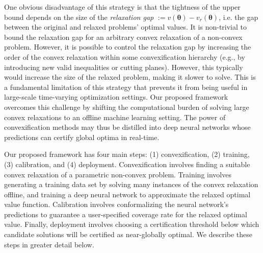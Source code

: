 \documentclass[10pt]{article} %
\theoremstyle{plain}
\theoremstyle{definition}
\theoremstyle{remark}
\begin{document}
One obvious disadvantage of this strategy is that the tightness of the upper bound depends on the size of the \textit{relaxation gap} $:= v(\bm{\theta}) - v_r(\bm{\theta})$, i.e. the gap between the original and relaxed problems' optimal values. It is non-trivial to bound the relaxation gap for an arbitrary convex relaxation of a non-convex problem. However, it is possible to control the relaxation gap by increasing the order of the convex relaxation within some convexification hierarchy (e.g., by introducing new valid inequalities or cutting planes). However, this typically would increase the size of the relaxed problem, making it slower to solve. 
This is a fundamental limitation of this strategy that prevents it from being useful in large-scale time-varying optimization settings.
Our proposed framework overcomes this challenge by shifting the computational burden of solving large convex relaxations to an offline machine learning setting.
The power of convexification methods may thus be distilled into deep neural networks whose predictions can certify global optima in real-time.

Our proposed framework has four main steps: (1) convexification, (2) training, (3) calibration, and (4) deployment. Convexification involves finding a suitable convex relaxation of a parametric non-convex problem. Training involves generating a training data set by solving many instances of the convex relaxation offline, and training a deep neural network to approximate the relaxed optimal value function. Calibration involves conformalizing the neural network's predictions to guarantee a user-specified coverage rate for the relaxed optimal value. Finally, deployment involves choosing a certification threshold below which candidate solutions will be certified as near-globally optimal.
We describe these steps in greater detail below.

\end{document}
